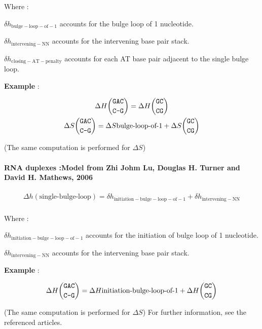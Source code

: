 \documentclass{article}
\begin{document}
Where :

$\delta{}h_\mathrm{bulge-loop-of-1}$ accounts for the bulge loop of 1 nucleotide.

$\delta{}h_\mathrm{intervening-NN}$ accounts for the intervening base pair stack.

$\delta{}h_\mathrm{closing-AT-penalty}$ accounts for each AT base pair adjacent
to the single bulge loop.

\textbf{Example} :

\begin{multline*}
\Delta H {\mbox{\texttt{GAC}} \choose \mbox{\texttt{C-G}}} =
\Delta H {\mbox{\texttt{GC}} \choose \mbox{\texttt{CG}}} \\
\Delta S {\mbox{\texttt{GAC}} \choose \mbox{\texttt{C-G}}} =
\Delta S {\mbox{bulge-loop-of-1}} +
\Delta S {\mbox{\texttt{GC}} \choose \mbox{\texttt{CG}}} \\
\end{multline*}

       (The same computation is performed for $\Delta S$) 

\paragraph{RNA duplexes :\textbf{Model from Zhi Johm Lu, Douglas H. Turner and David H. Mathews, 2006}} 

\begin{multline*}
\Delta h {(\mbox{single-bulge-loop})} =
\delta{}h_\mathrm{initiation-bulge-loop-of-1} +
\delta{}h_\mathrm{intervening-NN} \\
\end{multline*}


Where :

$\delta{}h_\mathrm{initiation-bulge-loop-of-1}$ accounts for the initiation of  bulge loop of 1 nucleotide.

$\delta{}h_\mathrm{intervening-NN}$ accounts for the intervening base pair stack.


\textbf{Example} :

\begin{multline*}
\Delta H {\mbox{\texttt{GAC}} \choose \mbox{\texttt{C-G}}} =
\Delta H {\mbox{initiation-bulge-loop-of-1}} +
\Delta H {\mbox{\texttt{GC}} \choose \mbox{\texttt{CG}}} \\
\end{multline*}

       (The same computation is performed for $\Delta S$) 
For further information, see the referenced articles.
\end{document}
